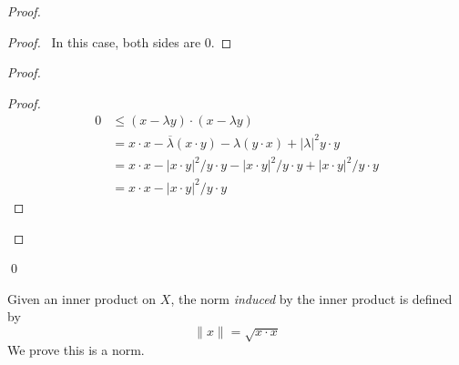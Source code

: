 \begin{proof}
  \pf
  \begin{proof}
    \pf\ In this case, both sides are 0.
  \end{proof}
  \begin{proof}
    \begin{proof}
      \pf
      \begin{align*}
        0 & \leq (x - \lambda y) \cdot (x - \lambda y) \\
        & = x \cdot x - \overline{\lambda} (x \cdot y) - \lambda (y \cdot x) + |\lambda|^2 y \cdot y \\
        & = x \cdot x - | x \cdot y |^2 / y \cdot y - |x \cdot y|^2 / y \cdot y + |x \cdot y|^2 / y \cdot y \\
        & = x \cdot x - |x \cdot y|^2 / y \cdot y
      \end{align*}
    \end{proof}
  \end{proof}
  \qed
\end{proof}

\begin{df}
  Given an inner product on $X$, the norm \emph{induced} by the inner product is defined by
  \[ \| x \| = \sqrt{x \cdot x} \]
  We prove this is a norm.
\end{df}

